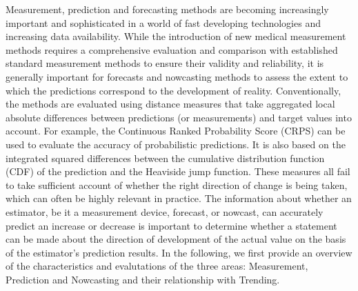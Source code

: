
Measurement, prediction and forecasting methods are becoming increasingly important and sophisticated in a world of fast developing technologies and increasing data availability. While the introduction of new medical measurement methods requires a comprehensive evaluation and comparison with established standard measurement methods to ensure their validity and reliability, it is generally important for forecasts and nowcasting methods to assess the extent to which the predictions correspond to the development of reality. Conventionally, the methods are evaluated using distance measures that take aggregated local absolute differences between predictions (or measurements) and target values into account. For example, the Continuous Ranked Probability Score (CRPS) can be used to evaluate the accuracy of probabilistic predictions. It is also based on the integrated squared differences between the cumulative distribution function (CDF) of the prediction and the Heaviside jump function. These measures all fail to take sufficient account of whether the right direction of change is being taken, which can often be highly relevant in practice. The information about whether an estimator, be it a measurement device, forecast, or nowcast, can accurately predict an increase or decrease is important to determine whether a statement can be made about the direction of development of the actual value on the basis of the estimator's prediction results. In the following, we first provide an overview of the characteristics and evalutations of the three areas: Measurement, Prediction and Nowcasting and their relationship with Trending.
 
